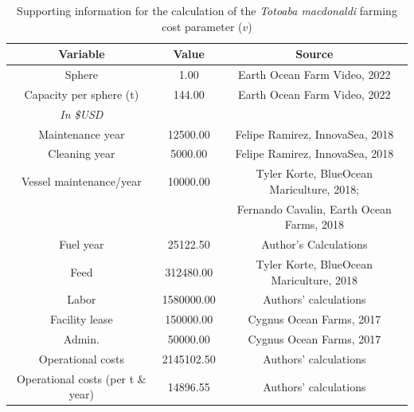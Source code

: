 \begin{landscape}
\begin{table}[H]

\centering
\begin{tabular}[t]{ccc}
\hline
Variable & Value & Source\\
\hline\hline
Sphere & 1.00 & Earth Ocean Farm Video, 2022\\
Capacity per sphere (t) & 144.00 & Earth Ocean Farm Video, 2022\\
\hline \hline
\textit{In \$USD} & & \\
\hline
Maintenance year & 12500.00 & Felipe Ramirez, InnovaSea, 2018\\
Cleaning year & 5000.00 & Felipe Ramirez, InnovaSea, 2018\\
Vessel maintenance/year & 10000.00 & Tyler Korte, BlueOcean Mariculture, 2018;\\
& & 
Fernando Cavalin, Earth Ocean Farms, 2018\\
Fuel year & 25122.50 & Author's Calculations\\
Feed & 312480.00 & Tyler Korte, BlueOcean Mariculture, 2018\\
Labor & 1580000.00 & Authors' calculations\\
Facility lease & 150000.00 & Cygnus Ocean Farms, 2017\\
Admin. & 50000.00 & Cygnus Ocean Farms, 2017\\
\hline
Operational costs & 2145102.50 & Authors' calculations\\
Operational costs (per t \& year) & 14896.55 & Authors' calculations \\
\hline
\end{tabular}
\caption{Supporting information for the calculation of the \textit{Totoaba macdonaldi} farming cost parameter ($v$)}

\label{tab:costv}
\end{table}
\end{landscape}

\newpage




